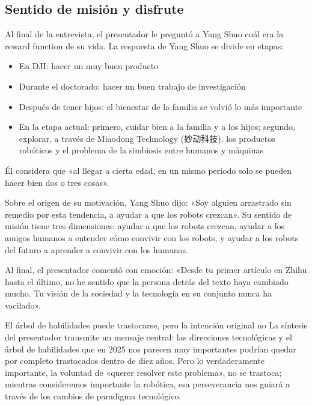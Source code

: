 \documentclass[a4paper]{article}
\begin{document}
\subsection{Sentido de misión y disfrute}

Al final de la entrevista, el presentador le preguntó a Yang Shuo cuál era la reward function de su vida. La respuesta de Yang Shuo se divide en etapas:
\begin{itemize}
    \item En DJI: hacer un muy buen producto
    \item Durante el doctorado: hacer un buen trabajo de investigación
    \item Después de tener hijos: el bienestar de la familia se volvió lo más importante
    \item En la etapa actual: primero, cuidar bien a la familia y a los hijos; segundo, explorar, a través de Miaodong Technology (妙动科技), los productos robóticos y el problema de la simbiosis entre humanos y máquinas
\end{itemize}

Él considera que «al llegar a cierta edad, en un mismo periodo solo se pueden hacer bien dos o tres cosas».

Sobre el origen de su motivación, Yang Shuo dijo: «Soy alguien arrastrado sin remedio por esta tendencia, a ayudar a que los robots crezcan». Su sentido de misión tiene tres dimensiones: ayudar a que los robots crezcan, ayudar a los amigos humanos a entender cómo convivir con los robots, y ayudar a los robots del futuro a aprender a convivir con los humanos.

Al final, el presentador comentó con emoción: «Desde tu primer artículo en Zhihu hasta el último, no he sentido que la persona detrás del texto haya cambiado mucho. Tu visión de la sociedad y la tecnología en su conjunto nunca ha vacilado».

\begin{warningbox}{El árbol de habilidades puede trastocarse, pero la intención original no}
La síntesis del presentador transmite un mensaje central: las direcciones tecnológicas y el árbol de habilidades que en 2025 nos parecen muy importantes podrían quedar por completo trastocados dentro de diez años. Pero lo verdaderamente importante, la voluntad de «querer resolver este problema», no se trastoca; mientras consideremos importante la robótica, esa perseverancia nos guiará a través de los cambios de paradigma tecnológico.
\end{warningbox}
\end{document}
